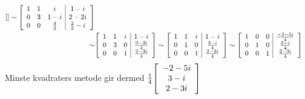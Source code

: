 \documentclass[11pt, a4paper, norsk]{NTNUoving}
\newenvironment{pkt}{\begin{punkt}}{\end{punkt}}
\newenvironment{matrise}[1][c]
{
\left[\begin{array}{#1}
}
{    
\end{array}\right]           
}
\begin{document}
\begin{oppgave}
\begin{pkt}
\begin{align*}
\begin{matrise}[ccc|c]
        \end{matrise} \sim \begin{matrise}[ccc|c]
            1 & 1 & i & 1-i \\ 0 & 3 & 1-i & 2-2i \\ 0 & 0 & \frac{4}{3} & \frac{2}{3}-i
        \end{matrise} \\ \sim& \begin{matrise}[ccc|c]
            1 & 1 & i & 1-i \\ 0 & 3 & 0 & \frac{9-3i}{4} \\ 0 & 0 & 1 & \frac{2-3i}{4}
        \end{matrise} \sim \begin{matrise}[ccc|c]
            1 & 1 & i & 1-i \\ 0 & 1 & 0 & \frac{3-i}{4} \\ 0 & 0 & 1 & \frac{2-3i}{4}
        \end{matrise} \sim \begin{matrise}[ccc|c]
            1 & 0 & 0 & \frac{-2-5i}{4} \\ 0 & 1 & 0 & \frac{3-i}{4} \\ 0 & 0 & 1 & \frac{2-3i}{4}
        \end{matrise}
        \end{align*}
        Minste kvadraters metode gir dermed $\frac{1}{4}\begin{matrise}[c]
        -2-5i \\ 3-i \\ 2-3i
        \end{matrise}$
    \end{pkt}
\end{oppgave}
\end{document}
